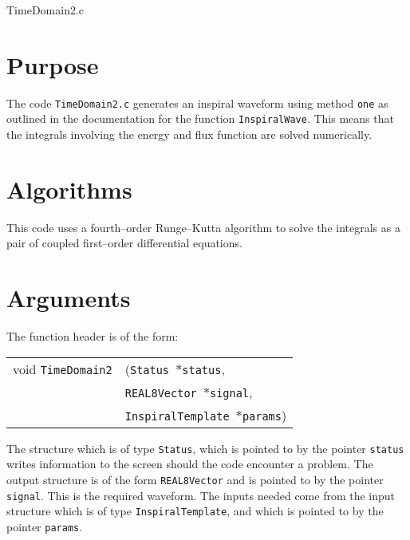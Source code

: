 \documentclass[12pt]{article}
\begin{document}
\huge
\begin{center}
TimeDomain2.c
\end{center}
\normalsize
\vspace{10mm}

\section{Purpose}

The code \texttt{TimeDomain2.c} generates an inspiral waveform using method \texttt{one} as outlined in the documentation for the function \texttt{InspiralWave}. This means that the integrals involving the energy and flux function are solved numerically.




\section{Algorithms}

This code uses a fourth--order Runge--Kutta algorithm to solve the integrals as a pair of coupled first--order differential equations.


\section{Arguments}

The function header is of the form:

\vspace{5mm}

\begin{tabular}{ll}
void \texttt{TimeDomain2}&(\texttt{Status $\ast$status},     \\
                                   &\texttt{REAL8Vector $\ast$signal}, \\
                                   &\texttt{InspiralTemplate $\ast$params})
\end{tabular}

\vspace{5mm}

The structure which is of type \texttt{Status}, which is pointed to by the pointer \texttt{status} writes information to the screen should the code encounter a problem. The output structure is of the form \texttt{REAL8Vector} and is pointed to by the pointer \texttt{signal}. This is the required waveform.
The inputs needed come from the input structure which is of type \texttt{InspiralTemplate}, and which is pointed to by the pointer \texttt{params}.
\end{document}
